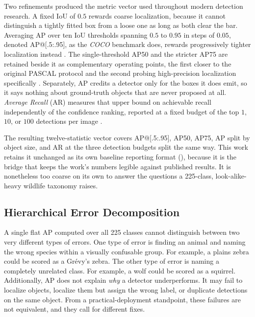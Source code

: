 Two refinements produced the metric vector used throughout modern detection research. A fixed IoU of $0.5$ rewards coarse localization, because it cannot distinguish a tightly fitted box from a loose one as long as both clear the bar. Averaging AP over ten IoU thresholds spanning $0.5$ to $0.95$ in steps of $0.05$, denoted AP@[.5:.95], as the \textit{COCO} benchmark does, rewards progressively tighter localization instead \cite{linMicrosoftCOCOCommon2015,zouObjectDetection202023}. The single-threshold AP50 and the stricter AP75 are retained beside it as complementary operating points, the first closer to the original PASCAL protocol and the second probing high-precision localization specifically \cite{zouObjectDetection202023}. Separately, AP credits a detector only for the boxes it does emit, so it says nothing about ground-truth objects that are never proposed at all. \textit{Average Recall} (AR) measures that upper bound on achievable recall independently of the confidence ranking, reported at a fixed budget of the top $1$, $10$, or $100$ detections per image \cite{zouObjectDetection202023}.

The resulting twelve-statistic vector covers AP@[.5:.95], AP50, AP75, AP split by object size, and AR at the three detection budgets split the same way. This work retains it unchanged as its own baseline reporting format (), because it is the bridge that keeps the work's numbers legible against published results. It is nonetheless too coarse on its own to answer the questions a 225-class, look-alike-heavy wildlife taxonomy raises.

\subsection{Hierarchical Error Decomposition}\label{sec:lit_hierarchical_evaluation}\label{sec:lit_error_decomposition}

A single flat AP computed over all 225 classes cannot distinguish between two very different types of errors. One type of error is finding an animal and naming the wrong species within a visually confusable group. For example, a plains zebra could be scored as a Grévy's zebra. The other type of error is naming a completely unrelated class. For example, a wolf could be scored as a squirrel. Additionally, AP does not explain \textit{why} a detector underperforms. It may fail to localize objects, localize them but assign the wrong label, or duplicate detections on the same object. From a practical-deployment standpoint, these failures are not equivalent, and they call for different fixes.

